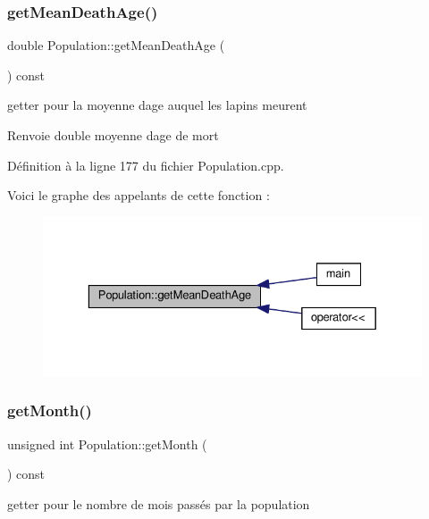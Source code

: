 \subsubsection{\texorpdfstring{get\+Mean\+Death\+Age()}{getMeanDeathAge()}}
{\footnotesize\ttfamily double Population\+::get\+Mean\+Death\+Age (\begin{DoxyParamCaption}{ }\end{DoxyParamCaption}) const}



getter pour la moyenne d\textquotesingle{}age auquel les lapins meurent 

\begin{DoxyReturn}{Renvoie}
double moyenne d\textquotesingle{}age de mort 
\end{DoxyReturn}


Définition à la ligne 177 du fichier Population.\+cpp.

Voici le graphe des appelants de cette fonction \+:
\nopagebreak
\begin{figure}[H]
\begin{center}
\leavevmode
\includegraphics[width=329pt]{classPopulation_aa5a0becf703f219c9e1a4270d54c397e_icgraph}
\end{center}
\end{figure}
\mbox{\label{classPopulation_a509a07b43df688b3b3235f586e5b3c07}} 
\subsubsection{\texorpdfstring{get\+Month()}{getMonth()}}
{\footnotesize\ttfamily unsigned int Population\+::get\+Month (\begin{DoxyParamCaption}{ }\end{DoxyParamCaption}) const}



getter pour le nombre de mois passés par la population 

